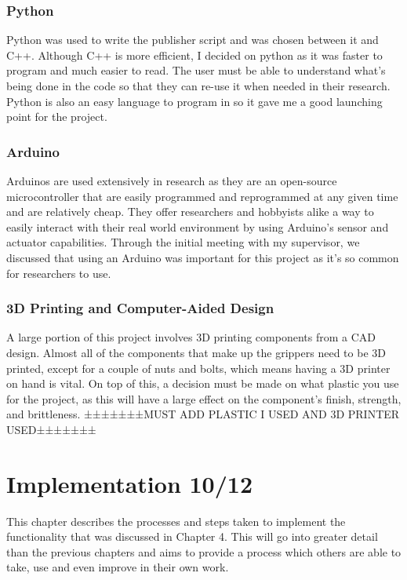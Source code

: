 \documentclass{l4proj}
\begin{document}
\subsection{Python}
Python was used to write the publisher script and was chosen between it and C++. Although C++ is more efficient, I decided on python as it was faster to program and much easier to read. The user must be able to understand what's being done in the code so that they can re-use it when needed in their research. Python is also an easy language to program in so it gave me a good launching point for the project. 

\subsection{Arduino} 
Arduinos are used extensively in research as they are an open-source microcontroller that are easily programmed and reprogrammed at any given time and are relatively cheap. They offer researchers and hobbyists alike a way to easily interact with their real world environment by using Arduino's sensor and actuator capabilities. Through the initial meeting with my supervisor, we discussed that using an Arduino was important for this project as it's so common for researchers to use.

\subsection{3D Printing and Computer-Aided Design}
A large portion of this project involves 3D printing components from a CAD design. Almost all of the components that make up the grippers need to be 3D printed, except for a couple of nuts and bolts, which means having a 3D printer on hand is vital. On top of this, a decision must be made on what plastic you use for the project, as this will have a large effect on the component's finish, strength, and brittleness. ±±±±±±±MUST ADD PLASTIC I USED AND 3D PRINTER USED±±±±±±±

\chapter{Implementation 10/12}
This chapter describes the processes and steps taken to implement the functionality that was discussed in Chapter 4. This will go into greater detail than the previous chapters and aims to provide a process which others are able to take, use and even improve in their own work. 
\end{document}
